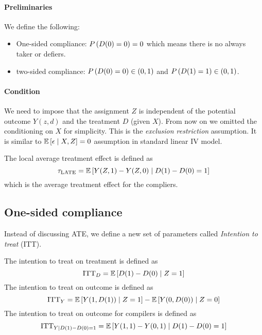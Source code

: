 \paragraph{Preliminaries}
We define the following:
\begin{itemize}
    \item One-sided compliance: $P\left(D(0)=0\right)=0$ which means there is no always taker or defiers. 
    \item two-sided compliance: $P\left(D(0)=0\right)\in (0,1)$ and $P\left(D(1)=1\right)\in (0,1)$.
\end{itemize}
\paragraph{Condition}
We need to impose that the assignment $Z$ is independent of the potential outcome $Y(z,d)$ and the treatment $D$ (given $X$). From now on we omitted the conditioning on $X$ for simplicity. This is the \emph{exclusion restriction} assumption. It is similar to $\mathbb{E}\left[\epsilon\mid X,Z\right]=0$ assumption in standard linear IV model.

\begin{definition}
    The local average treatment effect is defined as \begin{equation*}
        \tau_{\text{LATE}} = \mathbb{E}\left[Y(Z,1)-Y(Z,0)\mid D(1)-D(0)=1\right]
    \end{equation*}
    which is the average treatment effect for the compliers.
\end{definition}


\subsection{One-sided compliance}
Instead of discussing ATE, we define a new set of parameters called \emph{Intention to treat} (ITT).
\begin{definition}
    The intention to treat on treatment is defined as \begin{equation*}
        \text{ITT}_D = \mathbb{E}\left[D(1)-D(0)\mid Z=1\right]
    \end{equation*}
    The intention to treat on outcome is defined as \begin{equation*}
        \text{ITT}_Y = \mathbb{E}\left[Y(1,D(1))\mid Z=1\right]-\mathbb{E}\left[Y(0,D(0))\mid Z=0\right]
    \end{equation*}
    The intention to treat on outcome for compilers is defined as \begin{equation*}
        \text{ITT}_{Y\mid D(1)-D(0)=1} = \mathbb{E}\left[Y(1,1)-Y(0,1)\mid D(1)-D(0)=1\right]
    \end{equation*}
\end{definition} 
